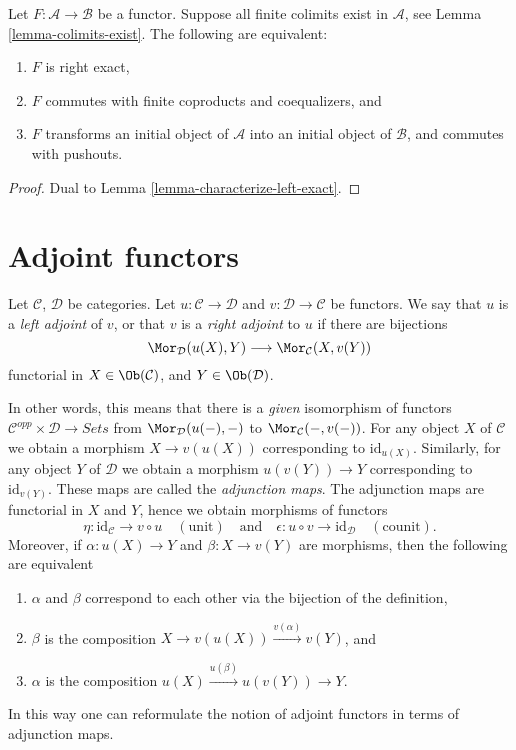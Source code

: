 \begin{lemma}
\label{lemma-characterize-right-exact}
Let $F : \mathcal{A} \to \mathcal{B}$ be a functor.
Suppose all finite colimits exist in $\mathcal{A}$,
see Lemma \ref{lemma-colimits-exist}.
The following are equivalent:
\begin{enumerate}
\item $F$ is right exact,
\item $F$ commutes with finite coproducts and coequalizers, and
\item $F$ transforms an initial object of $\mathcal{A}$
into an initial object of $\mathcal{B}$, and commutes with pushouts.
\end{enumerate}
\end{lemma}

\begin{proof}
Dual to Lemma \ref{lemma-characterize-left-exact}.
\end{proof}




\section{Adjoint functors}
\label{section-adjoint}

\begin{definition}
\label{definition-adjoint}
Let $\mathcal{C}$, $\mathcal{D}$ be categories.
Let $u : \mathcal{C} \to \mathcal{D}$ and
$v : \mathcal{D} \to \mathcal{C}$ be functors.
We say that $u$ is a {\it left adjoint} of $v$, or that
$v$ is a {\it right adjoint} to $u$ if there are bijections
$$
\Mor_\mathcal{D}(u(X), Y)
\longrightarrow
\Mor_\mathcal{C}(X, v(Y))
$$
functorial in $X \in \Ob(\mathcal{C})$, and
$Y \in \Ob(\mathcal{D})$.
\end{definition}

\noindent
In other words, this means that there is a {\it given} isomorphism of functors
$\mathcal{C}^{opp} \times \mathcal{D} \to \textit{Sets}$ from
$\Mor_\mathcal{D}(u(-), -)$ to $\Mor_\mathcal{C}(-, v(-))$. For any object
$X$ of $\mathcal{C}$ we obtain a morphism $X \to v(u(X))$ corresponding to
$\text{id}_{u(X)}$. Similarly, for any object $Y$ of $\mathcal{D}$ we obtain
a morphism $u(v(Y)) \to Y$ corresponding to $\text{id}_{v(Y)}$.
These maps are called the {\it adjunction maps}. The adjunction maps
are functorial in $X$ and $Y$, hence we obtain morphisms of functors
$$
\eta : \text{id}_\mathcal{C} \to v \circ u\quad (\text{unit})
\quad\text{and}\quad
\epsilon : u \circ v \to \text{id}_\mathcal{D}\quad (\text{counit}).
$$
Moreover, if $\alpha : u(X) \to Y$
and $\beta : X \to v(Y)$ are morphisms, then the following are equivalent
\begin{enumerate}
\item $\alpha$ and $\beta$ correspond to each other via the
bijection of the definition,
\item $\beta$ is the composition $X \to v(u(X)) \xrightarrow{v(\alpha)} v(Y)$,
and
\item $\alpha$ is the composition $u(X) \xrightarrow{u(\beta)} u(v(Y)) \to Y$.
\end{enumerate}
In this way one can reformulate the notion of adjoint functors in terms
of adjunction maps.

